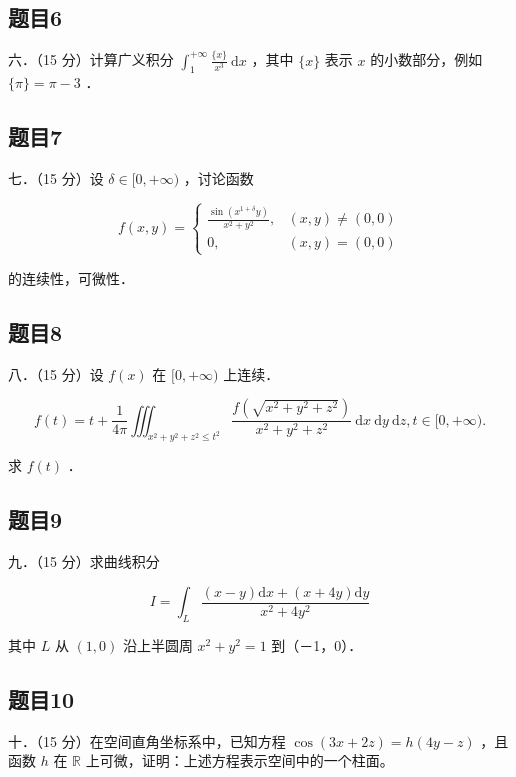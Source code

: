 \documentclass{article}
\begin{document}
\subsection{题目6}
六．（15 分）计算广义积分 \(\int_{1}^{+\infty} \frac{\{x\}}{x^{3}} \mathrm{~d} x\) ，其中 \(\{x\}\) 表示 \(x\) 的小数部分，例如 \(\{\pi\}=\pi-3\) ．

\subsection{题目7}
七．（15 分）设 \(\delta \in[0,+\infty)\) ，讨论函数

\[
f(x, y)= \begin{cases}\frac{\sin \left(x^{1+\delta} y\right)}{x^{2}+y^{2}}, & (x, y) \neq(0,0) \\ 0, & (x, y)=(0,0)\end{cases}
\]

的连续性，可微性．

\subsection{题目8}
八．（15 分）设 \(f(x)\) 在 \([0,+\infty)\) 上连续．

\[
f(t)=t+\frac{1}{4 \pi} \iiint_{x^{2}+y^{2}+z^{2} \leq t^{2}} \frac{f\left(\sqrt{x^{2}+y^{2}+z^{2}}\right)}{x^{2}+y^{2}+z^{2}} \mathrm{~d} x \mathrm{~d} y \mathrm{~d} z, t \in[0,+\infty) .
\]

求 \(f(t)\) ．

\subsection{题目9}
九．（15 分）求曲线积分

\[
I=\int_{L} \frac{(x-y) \mathrm{d} x+(x+4 y) \mathrm{d} y}{x^{2}+4 y^{2}}
\]

其中 \(L\) 从 \((1,0)\) 沿上半圆周 \(x^{2}+y^{2}=1\) 到（－1，0）．

\subsection{题目10}
十．（15 分）在空间直角坐标系中，已知方程 \(\cos (3 x+2 z)=h(4 y-z)\) ，且函数 \(h\) 在 \(\mathbb{R}\) 上可微，证明：上述方程表示空间中的一个柱面。
\end{document}
